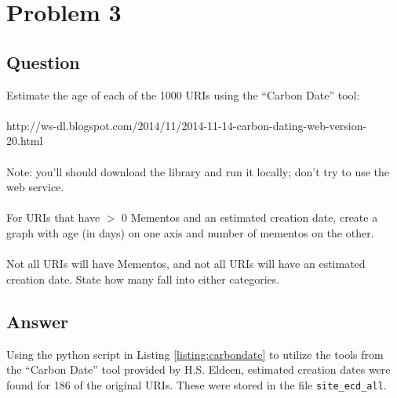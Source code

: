 \section{Problem 3}

\subsection{Question}
\vspace*{10pt}
Estimate the age of each of the 1000 URIs using the \enquote{Carbon Date} tool:\\
\\
http://ws-dl.blogspot.com/2014/11/2014-11-14-carbon-dating-web-version-20.html\\
\\
Note: you'll should download the library and run it locally; don't
try to use the web service.\\
\\
For URIs that have $>$ 0 Mementos and an estimated creation date,
create a graph with age (in days) on one axis and number of mementos
on the other.  \\
\\
Not all URIs will have Mementos, and not all URIs will have an estimated creation date.  State how many fall into either categories. 

\subsection{Answer}
\vspace{2mm}
Using the python script in Listing \ref{listing:carbondate} to utilize the tools from the 
\enquote{Carbon Date} tool provided by H.S. Eldeen, estimated creation dates were found for
186 of the original URIs. These were stored in the file {\tt site\_ecd\_all}.

